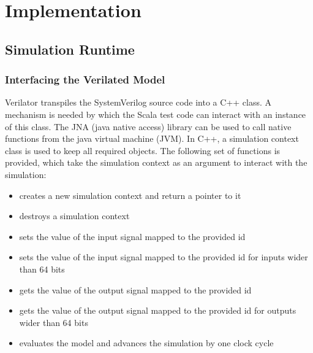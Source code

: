 \chapter{Implementation} %

\section{Simulation Runtime} %

\subsection{Interfacing the Verilated Model} %

Verilator transpiles the SystemVerilog source code into a C++ class. A mechanism is needed by which the Scala test
code can interact with an instance of this class. The JNA (java native access) library can be used to call native
functions from the java virtual machine (JVM). In C++, a simulation context class is used to keep all required
objects. The following set of functions is provided, which take the simulation context as an argument to interact
with the simulation:

\begin{itemize}
  \item {} creates a new simulation context and return a pointer to it
  \item {} destroys a simulation context
  \item {} sets the value of the input signal mapped to the provided id
  \item {} sets the value of the input signal mapped to the provided id for inputs wider than 64 bits
  \item {} gets the value of the output signal mapped to the provided id
  \item {} gets the value of the output signal mapped to the provided id for outputs wider than 64 bits
  \item {} evaluates the model and advances the simulation by one clock cycle
\end{itemize}

